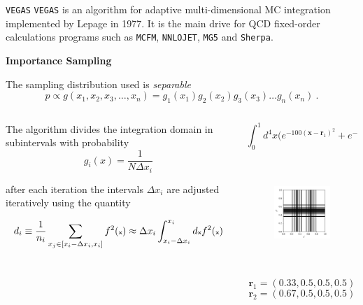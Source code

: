 \documentclass[t,handout,professionalfont,serif]{beamer}
\begin{document}
\begin{frame}{\texttt{VEGAS}}
	\tiny
	\texttt{VEGAS} is an algorithm for adaptive multi-dimensional MC integration implemented by Lepage in 1977.
	It is the main drive for QCD fixed-order calculations programs such as \texttt{MCFM}, \texttt{NNLOJET}, \texttt{MG5} and \texttt{Sherpa}.
	\vspace{0.3cm}
	
	\textbf{Importance Sampling}
	
	The sampling distribution used is \emph{separable}
	\tiny
	\begin{equation*}
		p \propto g(x_1,x_2,x_3,\dots,x_n) = g_1(x_1)g_2(x_2)g_3(x_3)\dots g_n(x_n) \ .
	\end{equation*}
	
	\begin{columns}
		\begin{column}{0.5 \textwidth}
			The algorithm divides the integration domain in subintervals with probability
			\begin{equation*}
				g_i(x) = \frac{1}{N \Delta x_i} 
			\end{equation*}
			
			after each iteration the intervals $\Delta x_i$ are adjusted iteratively using the quantity
			
			\begin{equation*}
				\tiny{d_i \equiv \frac{1}{n_i} \sum_{x_j \in \interval{x_i - \Delta x_i}{x_i} } f^2(\textbf{x}) \approx \Delta x_i \int_{x_i - \Delta x_i}^{x_i} d\textbf{x} f^2(\textbf{x})  }
			\end{equation*}
			
			
		\end{column}
		\begin{column}{0.5 \textwidth}
			\begin{equation*}
				\int_0^1 d^4 x \big(e^{-100(\textbf{x}- \textbf{r}_1)^2} + e^{-100(\textbf{x}- \textbf{r}_2)^2} \big) 
			\end{equation*}
			\vspace{-0.5cm}
			\begin{figure}[h]
				\centering
				\includegraphics[height = 4cm]{../tex/images/vegas_grid.png}
			\end{figure}
			\begin{equation*}
				\textbf{r}_1 = (0.33, 0.5, 0.5, 0.5) 
			\end{equation*}
			\begin{equation*}
				\textbf{r}_2 = (0.67, 0.5, 0.5, 0.5)
			\end{equation*}
		\end{column}
	\end{columns}
\end{frame}
\end{document}
